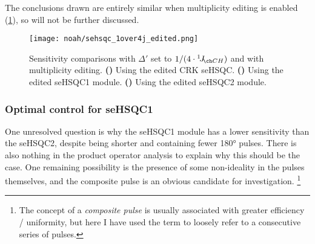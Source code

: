 The conclusions drawn are entirely similar when multiplicity editing is enabled (\cref{fig:noah_sehsqc_1over4j_edited}), so will not be further discussed.

\begin{figure}[!ht]
    \centering
    \texttt{[image: noah/sehsqc\_1over4j\_edited.png]}%
    {\label{fig:noah_sehsqc_1over4j_edited_crk}}%
    {\label{fig:noah_sehsqc_1over4j_edited_1}}%
    {\label{fig:noah_sehsqc_1over4j_edited_2}}%
    \caption[Sensitivity comparisons for edited seHSQC with $\Delta' = 1 / (4 \cdot \oneJ{CH})$]{
        Sensitivity comparisons with $\Delta'$ set to $1 / (4 \cdot \oneJ{CH})$ and with multiplicity editing.
        \textbf{()} Using the edited CRK seHSQC.
        \textbf{()} Using the edited seHSQC1 module.
        \textbf{()} Using the edited seHSQC2 module.
    }
    \label{fig:noah_sehsqc_1over4j_edited}
\end{figure}




\subsubsection{Optimal control for seHSQC1}

One unresolved question is why the seHSQC1 module has a lower sensitivity than the seHSQC2, despite being shorter and containing fewer \ang{180} pulses.
There is also nothing in the product operator analysis to explain why this should be the case.
One remaining possibility is the presence of some non-ideality in the pulses themselves, and the composite \proton{} pulse is an obvious candidate for investigation.%
\footnote{The concept of a \textit{composite pulse}\autocite{Levitt1986PNMRS} is usually associated with greater efficiency / uniformity, but here I have used the term to loosely refer to a consecutive series of pulses.}

